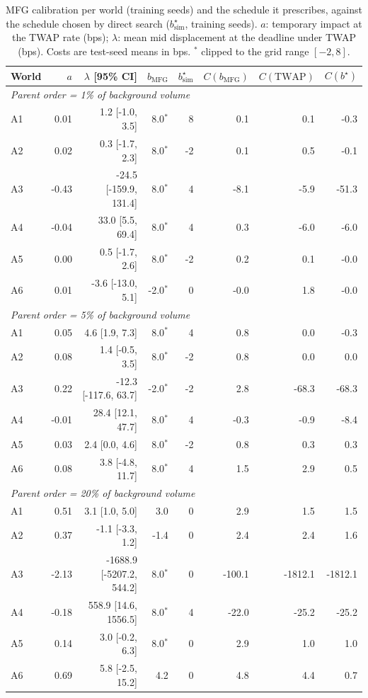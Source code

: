 \begin{table}[!htbp]
\centering\footnotesize
\caption{MFG calibration per world (training seeds) and the schedule it prescribes, against the schedule chosen by direct search ($b^\star_{\mathrm{sim}}$, training seeds). $a$: temporary impact at the TWAP rate (bps); $\lambda$: mean mid displacement at the deadline under TWAP (bps). Costs are test-seed means in bps. $^\ast$ clipped to the grid range $[-2,8]$.}\label{tab:mfg}
\begin{tabular}{lrrrrrrr}
\toprule
World & $a$ & $\lambda$ [95\% CI] & $b_{\mathrm{MFG}}$ & $b^\star_{\mathrm{sim}}$ & $C(b_{\mathrm{MFG}})$ & $C(\mathrm{TWAP})$ & $C(b^\star)$ \\
\midrule
\multicolumn{8}{l}{\emph{Parent order = 1\% of background volume}} \\
A1 & 0.01 & 1.2 [-1.0, 3.5] & 8.0$^\ast$ & 8 & 0.1 & 0.1 & -0.3 \\
A2 & 0.02 & 0.3 [-1.7, 2.3] & 8.0$^\ast$ & -2 & 0.1 & 0.5 & -0.1 \\
A3 & -0.43 & -24.5 [-159.9, 131.4] & 8.0$^\ast$ & 4 & -8.1 & -5.9 & -51.3 \\
A4 & -0.04 & 33.0 [5.5, 69.4] & 8.0$^\ast$ & 4 & 0.3 & -6.0 & -6.0 \\
A5 & 0.00 & 0.5 [-1.7, 2.6] & 8.0$^\ast$ & -2 & 0.2 & 0.1 & -0.0 \\
A6 & 0.01 & -3.6 [-13.0, 5.1] & -2.0$^\ast$ & 0 & -0.0 & 1.8 & -0.0 \\
\multicolumn{8}{l}{\emph{Parent order = 5\% of background volume}} \\
A1 & 0.05 & 4.6 [1.9, 7.3] & 8.0$^\ast$ & 4 & 0.8 & 0.0 & -0.3 \\
A2 & 0.08 & 1.4 [-0.5, 3.5] & 8.0$^\ast$ & -2 & 0.8 & 0.0 & 0.0 \\
A3 & 0.22 & -12.3 [-117.6, 63.7] & -2.0$^\ast$ & -2 & 2.8 & -68.3 & -68.3 \\
A4 & -0.01 & 28.4 [12.1, 47.7] & 8.0$^\ast$ & 4 & -0.3 & -0.9 & -8.4 \\
A5 & 0.03 & 2.4 [0.0, 4.6] & 8.0$^\ast$ & -2 & 0.8 & 0.3 & 0.3 \\
A6 & 0.08 & 3.8 [-4.8, 11.7] & 8.0$^\ast$ & 4 & 1.5 & 2.9 & 0.5 \\
\multicolumn{8}{l}{\emph{Parent order = 20\% of background volume}} \\
A1 & 0.51 & 3.1 [1.0, 5.0] & 3.0 & 0 & 2.9 & 1.5 & 1.5 \\
A2 & 0.37 & -1.1 [-3.3, 1.2] & -1.4 & 0 & 2.4 & 2.4 & 1.6 \\
A3 & -2.13 & -1688.9 [-5207.2, 544.2] & 8.0$^\ast$ & 0 & -100.1 & -1812.1 & -1812.1 \\
A4 & -0.18 & 558.9 [14.6, 1556.5] & 8.0$^\ast$ & 4 & -22.0 & -25.2 & -25.2 \\
A5 & 0.14 & 3.0 [-0.2, 6.3] & 8.0$^\ast$ & 0 & 2.9 & 1.0 & 1.0 \\
A6 & 0.69 & 5.8 [-2.5, 15.2] & 4.2 & 0 & 4.8 & 4.4 & 0.7 \\
\bottomrule
\end{tabular}
\end{table}
